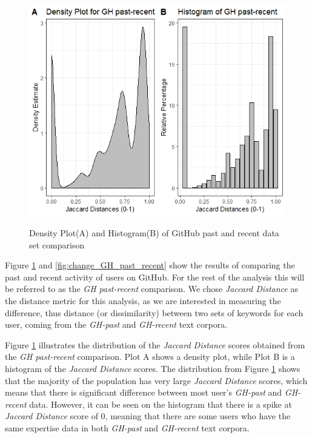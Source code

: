         \begin{figure}
          \centering
          \includegraphics[width=\textwidth]{figures/GH_past-recent.jpeg}\\
          \caption{Density Plot(A) and Histogram(B) of GitHub past and recent data set comparison}
          \label{fig:GH_past_recent}
        \end{figure}
        
        Figure \ref{fig:GH_past_recent} and \ref{fig:change_GH_past_recent} show the results of comparing the past and recent activity of users on GitHub. For the rest of the analysis this will be referred to as the \emph{GH past-recent} comparison. We chose \emph{Jaccard Distance} as the distance metric for this analysis, as we are interested in measuring the difference, thus distance (or dissimilarity) between two sets of keywords for each user, coming from the \emph{GH-past} and \emph{GH-recent} text corpora. 
        
        Figure \ref{fig:GH_past_recent} illustrates the distribution of the \emph{Jaccard Distance} scores obtained from the \emph{GH past-recent} comparison. Plot A shows a density plot, while Plot B is a histogram of the \emph{Jaccard Distance} scores. The distribution from Figure \ref{fig:GH_past_recent} shows that the majority of the population has very large \emph{Jaccard Distance} scores, which means that there is significant difference between most user's \emph{GH-past} and \emph{GH-recent} data. However, it can be seen on the histogram that there is a spike at \emph{Jaccard Distance} score of 0, meaning that there are some users who have the same expertise data in both \emph{GH-past} and \emph{GH-recent} text corpora. 
        
